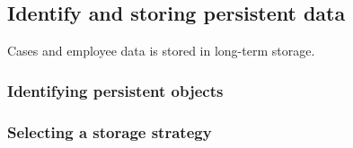 \subsection{Identify and storing persistent data}
Cases and employee data is stored in long-term storage.

\subsubsection{Identifying persistent objects}


\subsubsection{Selecting a storage strategy}

